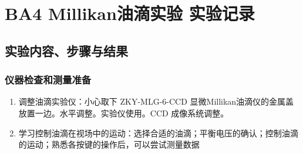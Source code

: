 \documentclass[dvipsnames, svgnames,a4paper,11pt]{article}
\begin{document}
	\section{BA4 Millikan油滴实验 \quad\heiti 实验记录}
	\subsection{实验内容、步骤与结果}
	\subsubsection{仪器检查和测量准备}
	\begin{enumerate}
		\item 调整油滴实验仪：小心取下 ZKY-MLG-6-CCD 显微Millikan油滴仪的金属盖放置一边。水平调整。实验仪使用。CCD 成像系统调整。
		\item 学习控制油滴在视场中的运动：选择合适的油滴；平衡电压的确认；控制油滴的运动；熟悉各按键的操作后，可以尝试测量数据 
	\end{enumerate}
	
\end{document}
